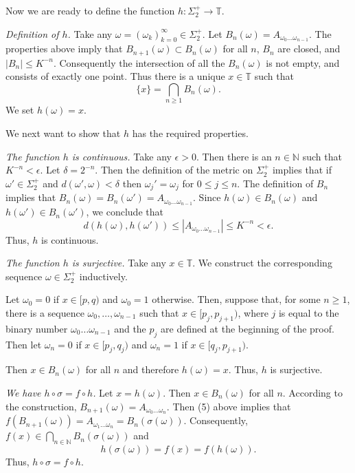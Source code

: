 \documentclass[12pt]{article}
\theoremstyle{definition}
\theoremstyle{remark}
\begin{document}
Now we are ready to define the function $h : \Sigma_2^+ \to \mathbb T$.

\medskip
\noindent
{\it Definition of $h$.} 
Take any $\omega = (\omega_k)_{k=0}^\infty \in \Sigma_2^+$.
Let $B_n(\omega) = A_{\omega_0 \ldots \omega_{n-1}}$. The properties above
imply that $B_{n+1}(\omega) \subset B_n(\omega)$ for all $n$, $B_n$ are closed, and
$|B_n| \le K^{-n}$. Consequently the
intersection of all the $B_n(\omega)$ is not empty, and consists of exactly one point. Thus there is a
unique $x \in \mathbb T$ such that
\[
\{x\} = \bigcap_{n \ge 1} B_n(\omega).
\]
We set $h(\omega)=x$.

We next want to show that $h$ has the required properties.

\medskip
\noindent
{\it The function $h$ is continuous.}
Take any $\epsilon>0$. Then there is an $n \in \mathbb N$ such that
$K^{-n}<\epsilon$. Let $\delta = 2^{-n}$. Then the definition of the metric on $\Sigma_2^+$ implies that
if $\omega' \in \Sigma_2^+$ and $d(\omega',\omega)<\delta$
then $\omega_j'=\omega_j$ for $0\le j \le n$. The definition of $B_n$ implies that
$B_n(\omega) = B_n(\omega') = A_{\omega_0 \ldots \omega_{n-1}}$.
Since $h(\omega) \in B_n(\omega)$ and $h(\omega') \in B_n(\omega')$, we conclude that 
\[
d(h(\omega),h(\omega')) \le |A_{\omega_0 \ldots \omega_{n-1}}| \le K^{-n} < \epsilon.
\]
Thus, $h$ is continuous.


\medskip
\noindent
{\it The function $h$ is surjective.}
Take any $x \in \mathbb T$. We construct the corresponding sequence $\omega \in \Sigma_2^+$ inductively.

Let $\omega_0 =0$ if $x \in [p,q)$ and $\omega_0=1$ otherwise.
Then, suppose that, for some $n \ge 1$, there is a sequence $\omega_0,\ldots,\omega_{n-1}$
such that $x \in [p_j,p_{j+1})$, where $j$ is equal to the binary number $\omega_0 \ldots \omega_{n-1}$ and the $p_j$ are defined at the beginning of the proof.
Then let $\omega_n=0$ if $x \in [p_j,q_j)$ and $\omega_n=1$ if $x \in [q_j,p_{j+1})$.

Then $x \in B_n(\omega)$ for all $n$ and therefore $h(\omega)=x$. Thus, $h$ is surjective.

\medskip
\noindent
{\it We have $h \circ \sigma = f \circ h$.}
Let $x = h(\omega)$. Then $x \in B_n(\omega)$ for all $n$. According to the construction,
$B_{n+1}(\omega) = A_{\omega_0 \ldots \omega_n}$. Then (5) above implies that
$f(B_{n+1}(\omega)) = A_{\omega_1 \ldots \omega_n}
= B_n(\sigma(\omega))$.
Consequently, $f(x) \in \bigcap_{n \in \mathbb N} B_n(\sigma(\omega))$ and
\[
h(\sigma(\omega)) = f(x) = f(h(\omega)).
\]
Thus, $h \circ \sigma = f \circ h$.
\end{document}
